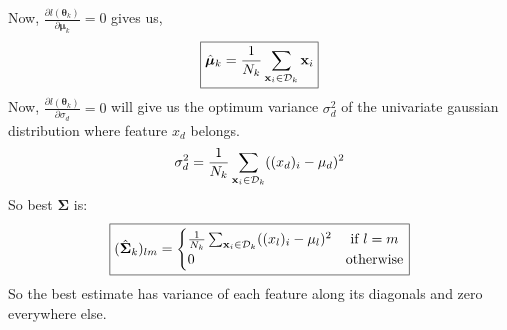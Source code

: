 \documentclass[11pt,paper=a4,answers]{exam}
\renewcommand{\vec}[1]{\mathbf{#1}}
\begin{document}
\begin{questions}
\begin{enumerate}[i.]
\begin{itemize}
                Now, $\frac{\partial l(\bm{\theta}_k)}{\partial \bm{\mu}_k} = 0$ gives us,
                $$\boxed{\hat{\bm{\mu}}_k = {1 \over N_k} \sum_{\vec{x}_i \in \mathcal{D}_k} \vec{x}_i }$$
                Now, $\frac{\partial l(\bm{\theta}_k)}{\partial \sigma_d} = 0$ will give us the optimum variance $\sigma _d^2$ of the univariate gaussian distribution where feature $x_d$ belongs.
                $$ \sigma _d^2 = {1 \over N_k}\sum_{\vec{x}_i \in \mathcal{D}_k} ((x_d)_i - \mu_d)^2$$
                So best $\bm{\Sigma}$ is:
                $$\boxed{(\hat{\bm{\Sigma}}_k)_{lm} =
                \begin{cases}
                    {1 \over N_k}\sum_{\vec{x}_i \in \mathcal{D}_k} ((x_l)_i - \mu_l)^2 &\text{ if } l = m\\
                    0 & \text{otherwise}
                \end{cases} }$$
                So the best estimate has variance of each feature along its diagonals and zero everywhere else.


\end{itemize}
\end{enumerate}
\end{questions}
\end{document}
